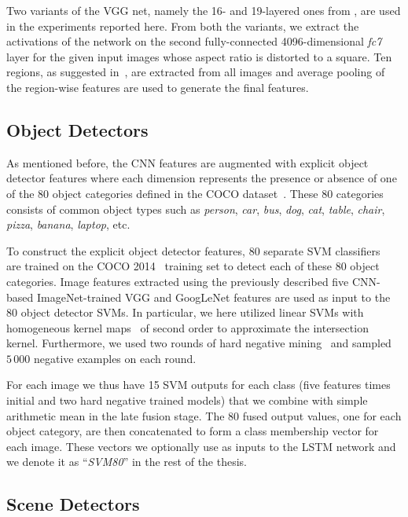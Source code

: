Two variants of the VGG net, namely the 16- and 19-layered ones from
\cite{Simonyan14c}, are used in the experiments reported here.
From both the variants, we extract the activations of the network on the second
fully-connected 4096-dimensional \emph{fc7} layer for the given input images
whose aspect ratio is distorted to a square.
Ten regions, as suggested in~\cite{Krizhevsky2012}, are extracted from all
images and average pooling of the region-wise features are used to generate the
final features.

\subsection{Object Detectors}
\label{subsec:svm80}

As mentioned before, the CNN features are augmented with explicit object
detector features where each dimension represents the presence or absence of one
of the 80 object categories defined in the COCO dataset~\cite{Lin2014}.
These 80 categories consists of common object types such as \emph{person},
\emph{car}, \emph{bus}, \emph{dog}, \emph{cat}, \emph{table}, \emph{chair},
\emph{pizza}, \emph{banana}, \emph{laptop}, etc.

To construct the explicit object detector features, 80 separate SVM
classifiers~\cite{cortes1995support} are trained on the COCO 2014~\cite{Lin2014}
training set to detect each of these 80 object categories.
Image features extracted using the previously described five CNN-based
ImageNet-trained VGG and GoogLeNet features are used as input to the 80 object
detector SVMs. 
In particular, we here utilized linear SVMs with homogeneous kernel
maps~\cite{Vedaldi2010} of second order to approximate the intersection kernel.
Furthermore, we used two rounds of hard negative mining~\cite{Li2013} and
sampled $5\,000$ negative examples on each round.

For each image we thus have 15 SVM outputs for each class (five features times
initial and two hard negative trained models) that we combine with simple
arithmetic mean in the late fusion stage.
The 80 fused output values, one for each object category, are then concatenated
to form a class membership vector for each image.
These vectors we optionally use as inputs to the LSTM network and we denote it
as ``\emph{SVM80}'' in the rest of the thesis.

\subsection{Scene Detectors}

